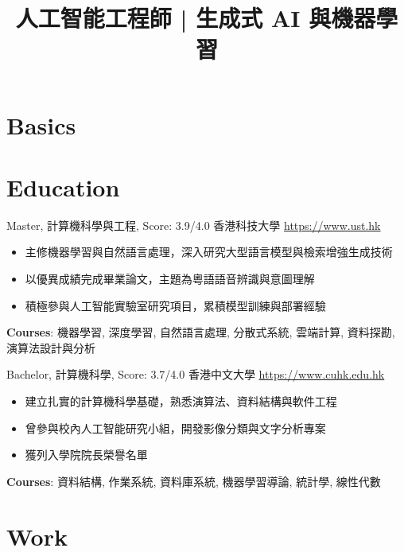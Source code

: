 \documentclass[a4paper, serif, 10pt]{moderncv}
\title{人工智能工程師 | 生成式 AI 與機器學習}
\begin{document}
\maketitle

\section{Basics}

\section{Education}

        {Master, 計算機科學與工程, Score: 3.9/4.0}
        {香港科技大學}
        {\url{https://www.ust.hk}}
        {}
        {\begin{itemize}
\item 主修機器學習與自然語言處理，深入研究大型語言模型與檢索增強生成技術
\item 以優異成績完成畢業論文，主題為粵語語音辨識與意圖理解
\item 積極參與人工智能實驗室研究項目，累積模型訓練與部署經驗
\end{itemize}
\textbf{Courses}: 機器學習, 深度學習, 自然語言處理, 分散式系統, 雲端計算, 資料探勘, 演算法設計與分析}

        {Bachelor, 計算機科學, Score: 3.7/4.0}
        {香港中文大學}
        {\url{https://www.cuhk.edu.hk}}
        {}
        {\begin{itemize}
\item 建立扎實的計算機科學基礎，熟悉演算法、資料結構與軟件工程
\item 曾參與校內人工智能研究小組，開發影像分類與文字分析專案
\item 獲列入學院院長榮譽名單
\end{itemize}
\textbf{Courses}: 資料結構, 作業系統, 資料庫系統, 機器學習導論, 統計學, 線性代數}
\section{Work}
\end{document}

